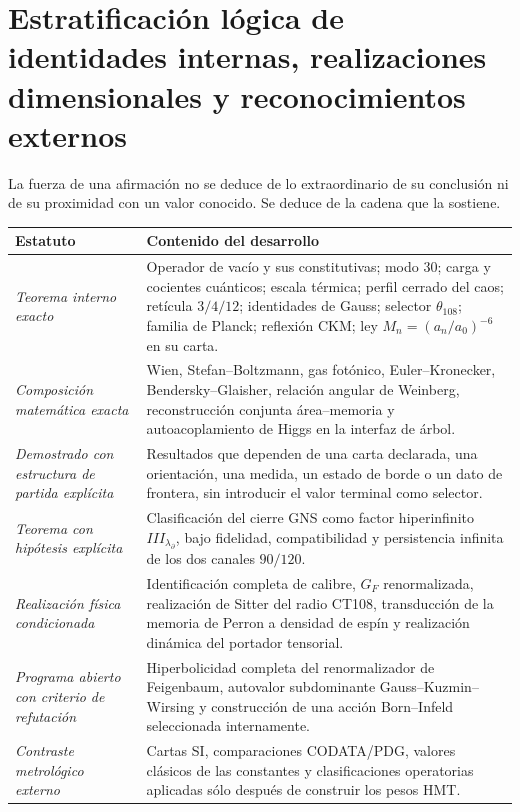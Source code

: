 \section{Estratificación lógica de identidades internas, realizaciones dimensionales y reconocimientos externos}

La fuerza de una afirmaci\'on no se deduce de lo extraordinario de su
conclusi\'on ni de su proximidad con un valor conocido. Se deduce de la cadena
que la sostiene.

\begin{longtable}{p{36mm}p{96mm}}
\toprule
Estatuto & Contenido del desarrollo\\
\midrule
\emph{Teorema interno exacto}
& Operador de vac\'io y sus constitutivas; modo \(30\); carga y cocientes
cu\'anticos; escala t\'ermica; perfil cerrado del caos; ret\'icula
\(3/4/12\); identidades de Gauss; selector \(\theta_{108}\); familia de
Planck; reflexi\'on CKM; ley
\(M_n=(a_n/a_0)^{-6}\) en su carta.\\

\emph{Composici\'on matem\'atica exacta}
& Wien, Stefan--Boltzmann, gas fot\'onico, Euler--Kronecker,
Bendersky--Glaisher, relaci\'on angular de Weinberg, reconstrucci\'on conjunta
\'area--memoria y autoacoplamiento de Higgs en la interfaz de \'arbol.\\

\emph{Demostrado con estructura de partida expl\'icita}
& Resultados que dependen de una carta declarada, una orientaci\'on, una
medida, un estado de borde o un dato de frontera, sin introducir el valor
terminal como selector.\\

\emph{Teorema con hip\'otesis expl\'icita}
& Clasificaci\'on del cierre GNS como factor hiperinfinito
\(III_{\lambda_\partial}\), bajo fidelidad, compatibilidad y persistencia
infinita de los dos canales \(90/120\).\\

\emph{Realizaci\'on f\'isica condicionada}
& Identificaci\'on completa de calibre, \(G_F\) renormalizada, realizaci\'on de
Sitter del
radio CT108, transducci\'on de la memoria de Perron a densidad de esp\'in y
realizaci\'on din\'amica del portador tensorial.\\

\emph{Programa abierto con criterio de refutación}
& Hiperbolicidad completa del renormalizador de Feigenbaum, autovalor
subdominante Gauss--Kuzmin--Wirsing y construcci\'on de una acci\'on
Born--Infeld seleccionada internamente.\\

\emph{Contraste metrol\'ogico externo}
& Cartas SI, comparaciones CODATA/PDG, valores cl\'asicos de las constantes y
clasificaciones operatorias aplicadas s\'olo despu\'es de construir los pesos
HMT.\\
\bottomrule
\end{longtable}

